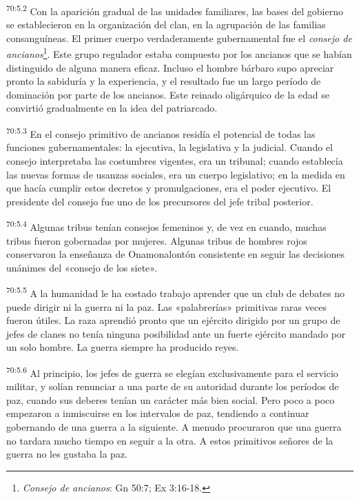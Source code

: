 \par
\textsuperscript{70:5.2} Con la aparición gradual de las unidades familiares, las bases del gobierno se establecieron en la organización del clan, en la agrupación de las familias consanguíneas. El primer cuerpo verdaderamente gubernamental fue el \textit{consejo de ancianos}\footnote{\textit{Consejo de ancianos}: Gn 50:7; Ex 3:16-18.}. Este grupo regulador estaba compuesto por los ancianos que se habían distinguido de alguna manera eficaz. Incluso el hombre bárbaro supo apreciar pronto la sabiduría y la experiencia, y el resultado fue un largo período de dominación por parte de los ancianos. Este reinado oligárquico de la edad se convirtió gradualmente en la idea del patriarcado.

\par
\textsuperscript{70:5.3} En el consejo primitivo de ancianos residía el potencial de todas las funciones gubernamentales: la ejecutiva, la legislativa y la judicial. Cuando el consejo interpretaba las costumbres vigentes, era un tribunal; cuando establecía las nuevas formas de usanzas sociales, era un cuerpo legislativo; en la medida en que hacía cumplir estos decretos y promulgaciones, era el poder ejecutivo. El presidente del consejo fue uno de los precursores del jefe tribal posterior.

\par
\textsuperscript{70:5.4} Algunas tribus tenían consejos femeninos y, de vez en cuando, muchas tribus fueron gobernadas por mujeres. Algunas tribus de hombres rojos conservaron la enseñanza de Onamonalontón consistente en seguir las decisiones unánimes del «consejo de los siete».

\par
\textsuperscript{70:5.5} A la humanidad le ha costado trabajo aprender que un club de debates no puede dirigir ni la guerra ni la paz. Las «palabrerías» primitivas raras veces fueron útiles. La raza aprendió pronto que un ejército dirigido por un grupo de jefes de clanes no tenía ninguna posibilidad ante un fuerte ejército mandado por un solo hombre. La guerra siempre ha producido reyes.

\par
\textsuperscript{70:5.6} Al principio, los jefes de guerra se elegían exclusivamente para el servicio militar, y solían renunciar a una parte de su autoridad durante los períodos de paz, cuando sus deberes tenían un carácter más bien social. Pero poco a poco empezaron a inmiscuirse en los intervalos de paz, tendiendo a continuar gobernando de una guerra a la siguiente. A menudo procuraron que una guerra no tardara mucho tiempo en seguir a la otra. A estos primitivos señores de la guerra no les gustaba la paz.

